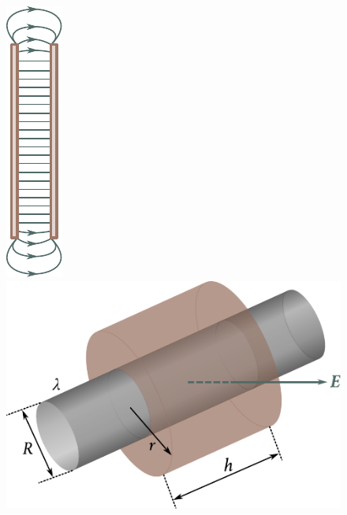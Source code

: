 \begin{figure}[t]
	\begin{minipage}[t]{0.35\linewidth}
		\begin{center}
			\includegraphics[scale=1]{figures/ch_01/fig_1_41.pdf}
			\caption[]{}
			\label{fig:1_41}
		\end{center}
	\end{minipage}
	\hspace{-0.05cm}
	\begin{minipage}[t]{0.65\linewidth}
		\begin{center}
			\includegraphics[scale=0.95]{figures/ch_01/fig_1_42.pdf}
			\caption[]{}
			\label{fig:1_42}
		\end{center}
	\end{minipage}
\vspace{-0.4cm}
\end{figure}

